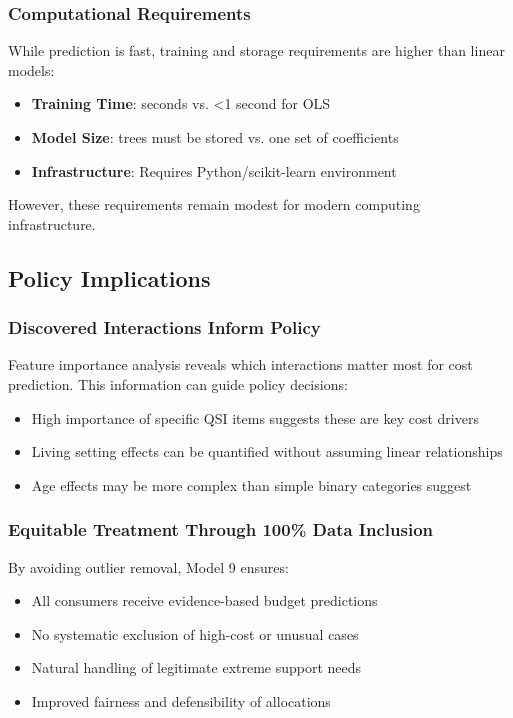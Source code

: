 \subsubsection{Computational Requirements}

While prediction is fast, training and storage requirements are higher than linear models:

\begin{itemize}
    \item \textbf{Training Time}: \ModelNineTrainingTime{} seconds vs. <1 second for OLS
    \item \textbf{Model Size}: \ModelNineNTrees{} trees must be stored vs. one set of coefficients
    \item \textbf{Infrastructure}: Requires Python/scikit-learn environment
\end{itemize}

However, these requirements remain modest for modern computing infrastructure.

\subsection{Policy Implications}

\subsubsection{Discovered Interactions Inform Policy}

Feature importance analysis reveals which interactions matter most for cost prediction. This information can guide policy decisions:

\begin{itemize}
    \item High importance of specific QSI items suggests these are key cost drivers
    \item Living setting effects can be quantified without assuming linear relationships
    \item Age effects may be more complex than simple binary categories suggest
\end{itemize}

\subsubsection{Equitable Treatment Through 100\% Data Inclusion}

By avoiding outlier removal, Model 9 ensures:

\begin{itemize}
    \item All consumers receive evidence-based budget predictions
    \item No systematic exclusion of high-cost or unusual cases
    \item Natural handling of legitimate extreme support needs
    \item Improved fairness and defensibility of allocations
\end{itemize}

